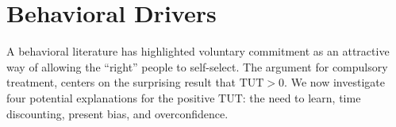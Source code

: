 \documentclass[12pt, a4paper, colorinlistoftodos]{article}
\begin{document}









\section{Behavioral Drivers}
\label{why_paternalism}

A behavioral literature has highlighted voluntary commitment as an attractive way of allowing the ``right'' people to self-select. %
The argument for compulsory treatment, centers on the surprising result that $\text{TUT}>0$. We now investigate four potential explanations for the positive $\text{TUT}$: the need to learn, time discounting, present bias, and overconfidence.
   
\end{document}
